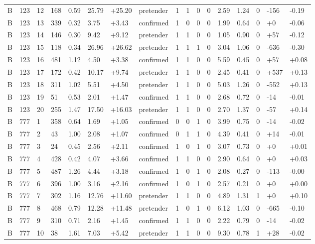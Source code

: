 \documentclass[11pt,a4paper]{article}
\begin{document}
{\begin{longtable}[]{@{}lllllllllllllllll@{}}
B & 123 & 12 & 168 & 0.59 & 25.79 & +25.20 & pretender & 1 & 1 & 0 & 0 & 2.59 & 1.24 & 0 & -156 & -0.19 \\
B & 123 & 13 & 339 & 0.32 & 3.75 & +3.43 & confirmed & 1 & 0 & 0 & 0 & 1.99 & 0.64 & 0 & +0 & -0.06 \\
B & 123 & 14 & 146 & 0.30 & 9.42 & +9.12 & pretender & 1 & 1 & 0 & 0 & 1.05 & 0.90 & 0 & +57 & -0.12 \\
B & 123 & 15 & 118 & 0.34 & 26.96 & +26.62 & pretender & 1 & 1 & 1 & 0 & 3.04 & 1.06 & 0 & -636 & -0.30 \\
B & 123 & 16 & 481 & 1.12 & 4.50 & +3.38 & confirmed & 1 & 1 & 0 & 0 & 5.59 & 0.45 & 0 & +57 & +0.08 \\
B & 123 & 17 & 172 & 0.42 & 10.17 & +9.74 & pretender & 1 & 1 & 0 & 0 & 2.45 & 0.41 & 0 & +537 & +0.13 \\
B & 123 & 18 & 311 & 1.02 & 5.51 & +4.50 & pretender & 1 & 1 & 0 & 0 & 5.03 & 1.26 & 0 & -552 & +0.13 \\
B & 123 & 19 & 51 & 0.53 & 2.01 & +1.47 & confirmed & 1 & 1 & 0 & 0 & 2.68 & 0.72 & 0 & -14 & -0.01 \\
B & 123 & 20 & 255 & 1.47 & 17.50 & +16.03 & pretender & 1 & 1 & 0 & 0 & 2.70 & 1.37 & 0 & -57 & +0.14 \\
B & 777 & 1 & 358 & 0.64 & 1.69 & +1.05 & confirmed & 0 & 0 & 1 & 0 & 3.99 & 0.75 & 0 & -14 & -0.02 \\
B & 777 & 2 & 43 & 1.00 & 2.08 & +1.07 & confirmed & 0 & 1 & 1 & 0 & 4.39 & 0.41 & 0 & +14 & -0.01 \\
B & 777 & 3 & 24 & 0.45 & 2.56 & +2.11 & confirmed & 1 & 0 & 1 & 0 & 3.07 & 0.73 & 0 & +0 & +0.01 \\
B & 777 & 4 & 428 & 0.42 & 4.07 & +3.66 & confirmed & 1 & 1 & 0 & 0 & 2.90 & 0.64 & 0 & +0 & +0.03 \\
B & 777 & 5 & 487 & 1.26 & 4.44 & +3.18 & confirmed & 1 & 0 & 1 & 0 & 2.08 & 0.27 & 0 & -113 & -0.00 \\
B & 777 & 6 & 396 & 1.00 & 3.16 & +2.16 & confirmed & 1 & 0 & 1 & 0 & 2.57 & 0.21 & 0 & +0 & +0.00 \\
B & 777 & 7 & 302 & 1.16 & 12.76 & +11.60 & pretender & 1 & 1 & 0 & 0 & 4.89 & 1.31 & 1 & +0 & +0.10 \\
B & 777 & 8 & 468 & 0.79 & 12.28 & +11.48 & pretender & 1 & 0 & 1 & 0 & 6.12 & 1.03 & 0 & -665 & -0.10 \\
B & 777 & 9 & 310 & 0.71 & 2.16 & +1.45 & confirmed & 1 & 1 & 0 & 0 & 2.22 & 0.79 & 0 & -14 & -0.02 \\
B & 777 & 10 & 38 & 1.61 & 7.03 & +5.42 & pretender & 1 & 1 & 0 & 0 & 9.30 & 0.78 & 1 & +28 & -0.02 \\

\end{longtable}}
\end{document}
